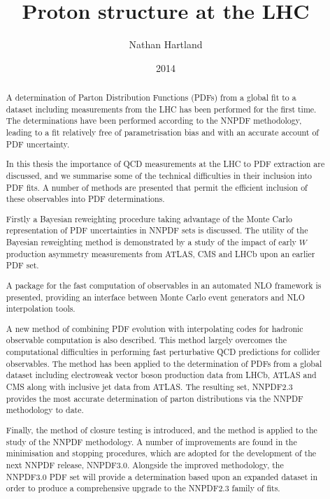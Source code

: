 \documentclass[12pt,twoside,openright]{report}
\title{Proton structure at the LHC}
\author{Nathan Hartland}
\date{2014}
\begin{document}
\maketitle
\setcounter{page}{1}
\dedication{To my parents}
\declaration

\acknowledgements

\begin{spacing}{1.5}

\begin{abstract}
A determination of Parton Distribution Functions (PDFs) from a global fit to a
dataset including measurements from the LHC has been performed for the first
time. The determinations have been performed according to the NNPDF methodology,
leading to a fit relatively free of parametrisation bias and with an accurate
account of PDF uncertainty.

In this thesis the importance of QCD measurements at the LHC to PDF extraction
are discussed, and we summarise some of the technical difficulties in their
inclusion into PDF fits. A number of methods are presented that permit the
efficient inclusion of these observables into PDF determinations.

Firstly a Bayesian reweighting procedure taking advantage of the Monte Carlo
representation of PDF uncertainties in NNPDF sets is discussed. The utility of
the Bayesian reweighting method is demonstrated by a study of the impact of
early $W$ production asymmetry measurements from ATLAS, CMS and LHCb upon an
earlier PDF set.

A package for the fast computation of observables in an automated NLO framework
is presented, providing an interface between Monte Carlo event generators and
NLO interpolation tools.

A new method of combining PDF evolution with interpolating codes for hadronic
observable computation is also described. This method largely overcomes the
computational difficulties in performing fast perturbative QCD predictions for
collider observables. The method has been applied to the determination of PDFs
from a global dataset including electroweak vector boson production data from
LHCb, ATLAS and CMS along with inclusive jet data from ATLAS\@. The resulting set,
NNPDF2.3 provides the most accurate determination of parton distributions via
the NNPDF methodology to date.

Finally, the method of closure testing is introduced, and the method is applied
to the study of the NNPDF methodology. A number of improvements are found in the
minimisation and stopping procedures, which are adopted for the development of
the next NNPDF release, NNPDF3.0. Alongside the improved methodology, the
NNPDF3.0 PDF set will provide a determination based upon an expanded dataset in
order to produce a comprehensive upgrade to the NNPDF2.3 family of fits.


\end{abstract}
\end{spacing}
\end{document}
